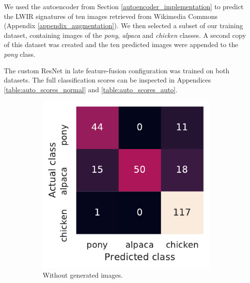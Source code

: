 \documentclass{l4proj}
\begin{document}
We used the autoencoder from Section \ref{autoencoder_implementation} to predict the LWIR signatures of ten images retrieved from Wikimedia Commons (Appendix \ref{appendix_augmentation}). We then selected a subset of our training dataset, containing images of the \textit{pony}, \textit{alpaca} and \textit{chicken} classes. A second copy of this dataset was created and the ten predicted images were appended to the \textit{pony} class.

The custom ResNet in late feature-fusion configuration was trained on both datasets. The full classification scores can be inspected in Appendices \ref{table:auto_scores_normal} and \ref{table:auto_scores_auto}. 

\begin{figure}[ht]
  \centering
  \begin{subfigure}[h!]{0.3\textwidth}
    \includegraphics[width=\textwidth]{images/evaluation/autoencoder/confusion_normal}
    \caption{Without generated images.}
    \label{fig:auto_confusion_normal}
  \end{subfigure}
  \begin{subfigure}[h!]{0.3\textwidth}

\end{subfigure}
\end{figure}
\end{document}
